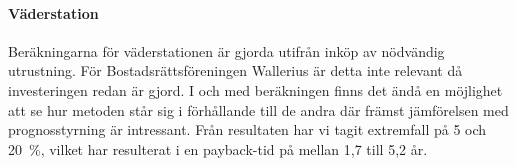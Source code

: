 \paragraph{Väderstation}
Beräkningarna för väderstationen är gjorda utifrån inköp av nödvändig utrustning. För Bostadsrättsföreningen Wallerius är detta inte relevant då investeringen redan är gjord. I och med beräkningen finns det ändå en möjlighet att se hur metoden står sig i förhållande till de andra där främst jämförelsen med prognosstyrning är intressant. Från resultaten har vi tagit extremfall på 5 och 20~\%, vilket har resulterat i en payback-tid på mellan 1,7 till 5,2 år.
